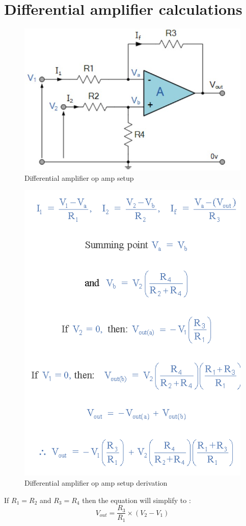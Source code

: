 \chapter{Differential amplifier calculations}
\begin{figure}[!htb]
	\centering
	\includegraphics[width=0.4\linewidth]{Figures/A6/difamp.jpg}
	\caption[Differential amplifier op amp setup]{Differential amplifier op amp setup\cite{difAmp} }
	\label{fig:difamp2}
\end{figure}

\begin{figure}[!htb]
	\centering
	\includegraphics[width=0.4\linewidth]{Figures/A6/derive.png}
	\caption[Differential amplifier op amp setup derivation]{Differential amplifier op amp setup derivation\cite{difAmp} }
	\label{fig:derive}
\end{figure}


If $R_1=R_2$ and $R_3=R_4$ then the equation will simplify to :
\begin{equation}
	V_{out}=\frac{R_3}{R_1}\times(V_2-V_1)
\end{equation}




